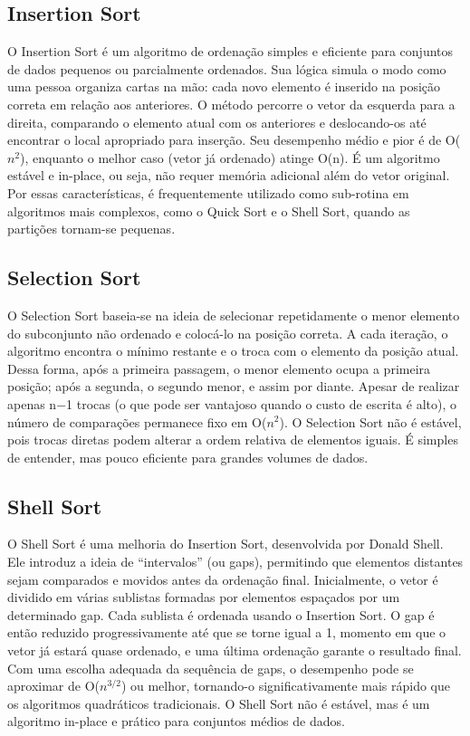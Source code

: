 \documentclass[
	article,			%
	11pt,				%
	oneside,			%
	a4paper,			%
	english,			%
	brazil,				%
	sumario=tradicional
	]{abntex2}
\begin{document}
\subsection{Insertion Sort}
O Insertion Sort é um algoritmo de ordenação simples e eficiente para conjuntos de dados pequenos ou parcialmente ordenados. Sua lógica simula o modo como uma pessoa organiza cartas na mão: cada novo elemento é inserido na posição correta em relação aos anteriores.
O método percorre o vetor da esquerda para a direita, comparando o elemento atual com os anteriores e deslocando-os até encontrar o local apropriado para inserção.
Seu desempenho médio e pior é de O($n^2$), enquanto o melhor caso (vetor já ordenado) atinge O(n). É um algoritmo estável e in-place, ou seja, não requer memória adicional além do vetor original. Por essas características, é frequentemente utilizado como sub-rotina em algoritmos mais complexos, como o Quick Sort e o Shell Sort, quando as partições tornam-se pequenas.

\subsection{Selection Sort}
O Selection Sort baseia-se na ideia de selecionar repetidamente o menor elemento do subconjunto não ordenado e colocá-lo na posição correta. A cada iteração, o algoritmo encontra o mínimo restante e o troca com o elemento da posição atual.
Dessa forma, após a primeira passagem, o menor elemento ocupa a primeira posição; após a segunda, o segundo menor, e assim por diante.
Apesar de realizar apenas n−1 trocas (o que pode ser vantajoso quando o custo de escrita é alto), o número de comparações permanece fixo em O($n^2$). O Selection Sort não é estável, pois trocas diretas podem alterar a ordem relativa de elementos iguais. É simples de entender, mas pouco eficiente para grandes volumes de dados.

    
\subsection{Shell Sort}
O Shell Sort é uma melhoria do Insertion Sort, desenvolvida por Donald Shell. Ele introduz a ideia de “intervalos” (ou gaps), permitindo que elementos distantes sejam comparados e movidos antes da ordenação final.
Inicialmente, o vetor é dividido em várias sublistas formadas por elementos espaçados por um determinado gap. Cada sublista é ordenada usando o Insertion Sort. O gap é então reduzido progressivamente até que se torne igual a 1, momento em que o vetor já estará quase ordenado, e uma última ordenação garante o resultado final.
Com uma escolha adequada da sequência de gaps, o desempenho pode se aproximar de O($n^{3/2}$) ou melhor, tornando-o significativamente mais rápido que os algoritmos quadráticos tradicionais. O Shell Sort não é estável, mas é um algoritmo in-place e prático para conjuntos médios de dados.
\end{document}
